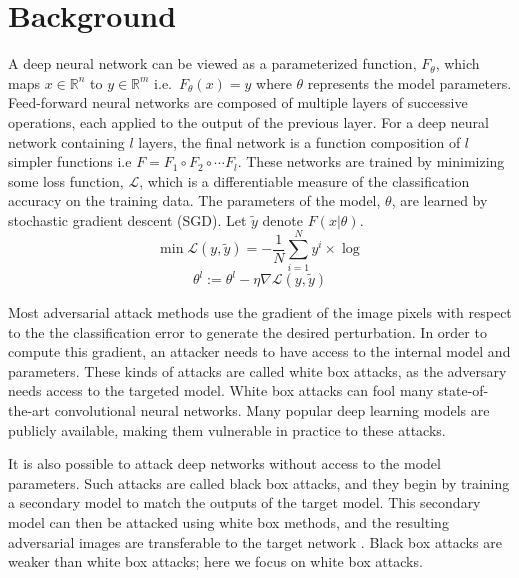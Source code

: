 \section{Background}
A deep neural network can be viewed as a parameterized function, $F_\theta$, which maps $x \in \mathbb{R}^n$ to $y \in \mathbb{R}^m$  i.e.\ $F_\theta(x) = y$ where $\theta$ represents the model parameters. 
Feed-forward neural networks are composed of multiple layers of successive operations, each applied to the output of the previous layer. For a deep neural network containing $l$ layers, the final network is a function composition of $l$ simpler functions i.e $F = F_1 \circ F_2 \circ \cdots F_l$.
These networks are trained by minimizing some loss function, $\mathcal{L}$, which is a differentiable measure of the classification accuracy on the training data.
The parameters of the model, $\theta$, are learned by stochastic gradient descent (SGD). 
Let $\widetilde{y}$ denote $F(x|\theta)$.
\[
   \min \mathcal{L}(y, \widetilde{y}) = - \frac{1}{N} \sum_{i=1}^N y^i \times \log %
\]
\[
   \theta^l := \theta^l - \eta \nabla \mathcal{L}(y,\widetilde{y})
\]

Most adversarial attack methods use the gradient of the image pixels with respect to the the classification error to generate the desired perturbation.
In order to compute this gradient, an attacker needs to have access to the internal model and parameters.
These kinds of attacks are called white box attacks, as the adversary needs access to the targeted model. 
White box attacks can fool many state-of-the-art convolutional neural networks. 
Many popular deep learning models are publicly available, making them vulnerable in practice to these attacks.


It is also possible to attack deep networks without access to the model parameters. 
Such attacks are called black box attacks, and they begin by training a secondary model to match the outputs of the target model.
This secondary model can then be attacked using white box methods, and the resulting adversarial images are transferable to the target network \cite{Papernot2016PracticalBA}. 
Black box attacks are weaker than white box attacks; here we focus on white box attacks. 

